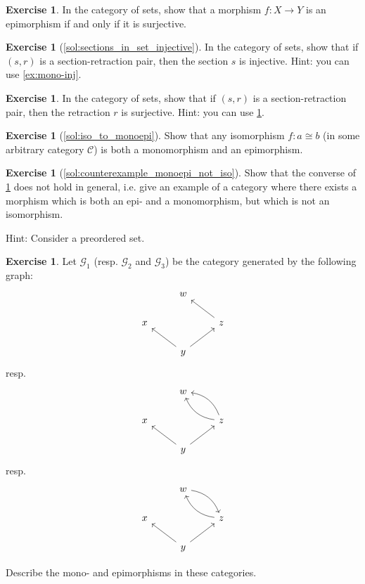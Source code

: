 \documentclass[a4paper,11pt, oneside,titlepage=false]{scrbook}
\theoremstyle{plain}
\theoremstyle{definition}
\newtheorem{exer}[thm]{Exercise}
\newcommand{\Cat}[1]{\mathcal{#1}}
\newcommand{\CC}{\Cat{C}}
\begin{document}
\begin{exer}\label{ex:epi-surj}
  In the category of sets, show that a morphism $f : X \to Y$ is an epimorphism if and only if it is surjective.
\end{exer}


\begin{exer}[\cref{sol:sections_in_set_injective}]\label{exer:sections_in_set_injective}
  In the category of sets, show that if $(s,r)$ is a section-retraction pair, then the section $s$ is injective.
  Hint: you can use \cref{ex:mono-inj}.
\end{exer}
\begin{exer}
  In the category of sets, show that if $(s,r)$ is a section-retraction pair, then the retraction $r$ is surjective.
    Hint: you can use \cref{ex:epi-surj}.
\end{exer}

\begin{exer}[\cref{sol:iso_to_monoepi}]\label{exer:iso_to_monoepi}
  Show that any isomorphism $f : a\cong b$ (in some arbitrary category $\CC$) is both a monomorphism and an epimorphism.
\end{exer}

\begin{exer}[\cref{sol:counterexample_monoepi_not_iso}]\label{exer:counterexample_monoepi_not_iso}
  Show that the converse of \cref{exer:iso_to_monoepi} does not hold in general, i.e. give an example of a category where there exists a morphism which is both an epi- and a monomorphism, but which is not an isomorphism.

Hint: Consider a preordered set.
\end{exer}

\begin{exer} Let $\mathcal{G}_1$ (resp. $\mathcal{G}_2$ and $\mathcal{G}_3$) be the category generated by the following graph:
\[
\begin{tikzcd}
& w & \\
x & & z \arrow[lu] \\
& y \arrow[lu] \arrow[ru] &
\end{tikzcd}
\]
resp.
\[
\begin{tikzcd}
& w & \\
x & & z \arrow[lu, bend left] \arrow[lu,bend right] \\
& y \arrow[lu] \arrow[ru] &
\end{tikzcd}
\]
resp.
\[
\begin{tikzcd}
& w \arrow[rd,bend left] & \\
x & & z \arrow[lu, bend left] \\
& y \arrow[lu] \arrow[ru] &
\end{tikzcd}
\]

Describe the mono- and epimorphisms in these categories.
\end{exer}
\end{document}
